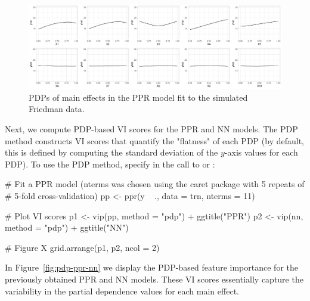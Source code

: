 
\begin{figure}[!htb]
  \centering 
  \includegraphics[width=1\linewidth]{figures/pdp-ppr} 
  \caption{PDPs of main effects in the PPR model fit to the simulated Friedman data.}
  \label{fig:pdp-ppr}
\end{figure}

Next, we compute PDP-based VI scores for the PPR and NN models. The PDP method constructs VI scores that quantify the "flatness" of each PDP (by default, this is defined by computing the standard deviation of the $y$-axis values for each PDP). To use the PDP method, specify  in the call to  or :

\begin{example}
# Fit a PPR model (nterms was chosen using the caret package with 5 repeats of 
# 5-fold cross-validation)
pp <- ppr(y ~ ., data = trn, nterms = 11)  

# Plot VI scores
p1 <- vip(pp, method = "pdp") + ggtitle("PPR")
p2 <- vip(nn, method = "pdp") + ggtitle("NN")

# Figure X
grid.arrange(p1, p2, ncol = 2)
\end{example}

In Figure~\ref{fig:pdp-ppr-nn} we display the PDP-based feature importance for the previously obtained PPR and NN models. These VI scores essentially capture the variability in the partial dependence values for each main effect.


